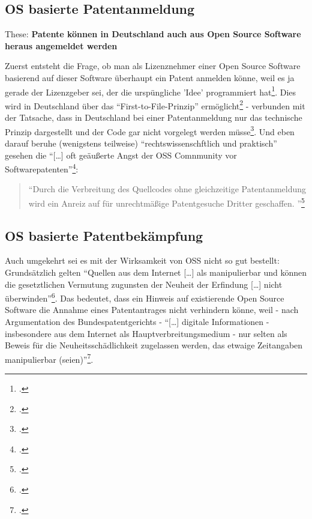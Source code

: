 \documentclass[DIV=calc,BCOR=5mm,11pt,headings=small,oneside,abstract=true, toc=bib]{scrartcl}
\begin{document}
\subsection{OS basierte Patentanmeldung}

These: \textbf{Patente können in Deutschland auch aus Open Source Software
heraus angemeldet werden}

Zuerst entsteht die Frage, ob man als Lizenznehmer einer Open Source Software
basierend auf dieser Software überhaupt ein Patent anmelden könne, weil es ja
gerade der Lizenzgeber sei, der die urspüngliche 'Idee' programmiert
hat\footcite[vgl.][21]{Suchomski2011a}. Dies wird in Deutschland über das
\enquote{First-to-File-Prinzip}
ermöglicht\footcite[vgl.][21]{Suchomski2011a} - verbunden mit der Tatsache, dass
in Deutschland bei einer Patentanmeldung nur das technische Prinzip dargestellt
und der Code gar nicht vorgelegt werden
müsse\footcite[vgl.][26]{Suchomski2011a}. Und eben darauf beruhe (wenigstens
teilweise) \enquote{rechtswissenschftlich und praktisch} gesehen die
\enquote{[\ldots] oft geäußerte Angst der OSS Comnmunity vor
Softwarepatenten}\footcite[vgl.][27]{Suchomski2011a}: 

\begin{quote}
\enquote{Durch die Verbreitung des Quellcodes ohne gleichzeitige Patentanmeldung
wird ein Anreiz auf für unrechtmäßige Patentgesuche Dritter geschaffen.
}\footcite[vgl.][27]{Suchomski2011a}
\end{quote}

\subsection{OS basierte Patentbekämpfung}
Auch umgekehrt sei es mit der Wirksamkeit von OSS nicht so gut bestellt:
Grundsätzlich gelten \enquote{Quellen aus dem Internet [\ldots] als
manipulierbar und können die gesetztlichen Vermutung zugunsten der
Neuheit der Erfindung [\ldots] nicht
überwinden}\footcite[vgl.][27]{Suchomski2011a}. Das bedeutet, dass ein
Hinweis auf existierende Open Source Software die Annahme eines Patentantrages
nicht verhindern könne, weil - nach Argumentation des Bundespatentgerichts -
\enquote{[\ldots] digitale Informationen - insbesondere aus dem Internet
als Hauptverbreitungsmedium - nur selten als Beweis für die
Neuheitsschädlichkeit zugelassen werden, das etwaige Zeitangaben
manipulierbar (seien)}\footcite[vgl.][33]{Suchomski2011a}.
\end{document}
